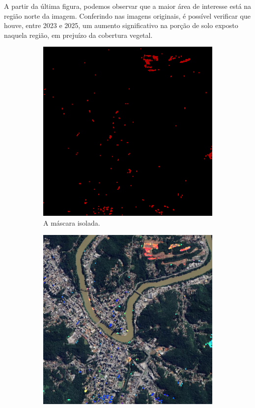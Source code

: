 \documentclass{article}
\begin{document}
A partir da última figura, podemos observar que a maior área de interesse está na região norte da imagem. Conferindo nas imagens originais, é possível verificar que houve, entre 2023 e 2025, um aumento significativo na porção de solo exposto naquela região, em prejuízo da cobertura vegetal.

\begin{figure}[H]
    \centering
    \begin{subfigure}[b]{0.48\textwidth}
        \includegraphics[width=\textwidth]{../Imagens/resultado01_mask.png}
        \caption{A máscara isolada.}
        \label{2025}
    \end{subfigure}
    \hfill %
    \begin{subfigure}[b]{0.48\textwidth}
        \includegraphics[width=\textwidth]{../Imagens/012025_mask.png}

\end{subfigure}
\end{figure}
\end{document}
